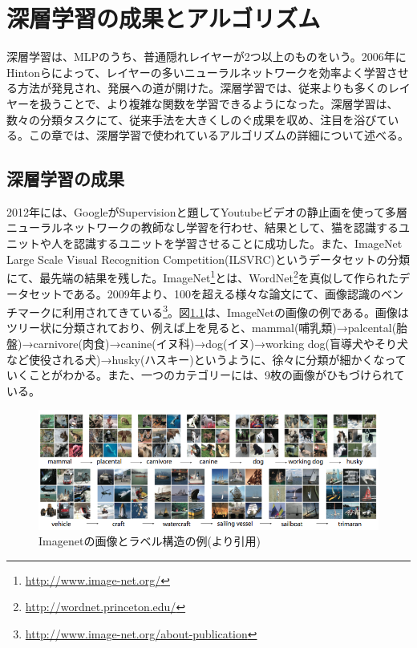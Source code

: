 \chapter{深層学習の成果とアルゴリズム}
深層学習は、MLPのうち、普通隠れレイヤーが2つ以上のものをいう。2006年にHintonらによって、レイヤーの多いニューラルネットワークを効率よく学習させる方法が発見され、発展への道が開けた\cite{hinton2006a-fast, hinton2006reducing}。深層学習では、従来よりも多くのレイヤーを扱うことで、より複雑な関数を学習できるようになった。深層学習は、数々の分類タスクにて、従来手法を大きくしのぐ成果を収め、注目を浴びている。この章では、深層学習で使われているアルゴリズムの詳細について述べる。
\section{深層学習の成果}
2012年には、GoogleがSupervisionと題してYoutubeビデオの静止画を使って多層ニューラルネットワークの教師なし学習を行わせ、結果として、猫を認識するユニットや人を認識するユニットを学習させることに成功した。また、ImageNet Large Scale Visual Recognition Competition(ILSVRC)というデータセット\cite{deng2009imagenet:}の分類にて、最先端の結果を残した。ImageNet\footnote{\url{http://www.image-net.org/}}とは、WordNet\footnote{\url{http://wordnet.princeton.edu/}}を真似して作られたデータセットである。2009年より、100を超える様々な論文にて、画像認識のベンチマークに利用されてきている\footnote{\url{http://www.image-net.org/about-publication}}。図\ref{c3_imagenet}は、ImageNetの画像の例である。画像はツリー状に分類されており、例えば上を見ると、mammal(哺乳類)→palcental(胎盤)→carnivore(肉食)→canine(イヌ科)→dog(イヌ)→working dog(盲導犬やそり犬など使役される犬)→husky(ハスキー)というように、徐々に分類が細かくなっていくことがわかる。また、一つのカテゴリーには、9枚の画像がひもづけられている。\par
\begin{figure}[tbp]
 \begin{center}
  \includegraphics[width=120mm]{img/c3/imagenet}
 \end{center}
 \caption{Imagenetの画像とラベル構造の例(\cite{krizhevsky2012imagenet}より引用)}
 \label{c3_imagenet}
\end{figure}
